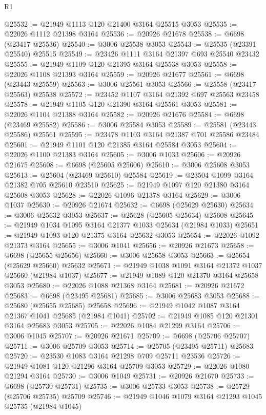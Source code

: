 \begin{lexlean}{R1}
\begin{coremodule}
@25532 := @21949 @1113 @120 @21400 @3164 @25515 @3053
@25535 := @22026 @1112 @21398 @3164
@25536 := @20926 @21678
@25538 := @6698 (@23417 @25536)
@25540 := @3006 @25538 @3053
@25543 := @25535 (@23391 @25540) @25515
@25549 := @23426 @1111 @3164 @21397 @693 @25540 @23432
@25555 := @21949 @1109 @120 @21395 @3164 @25538 @3053
@25558 := @22026 @1108 @21393 @3164
@25559 := @20926 @21677
@25561 := @6698 (@23443 @25559)
@25563 := @3006 @25561 @3053
@25566 := @25558 (@23417 @25563) @25538
@25572 := @23452 @1107 @3164 @21392 @697 @25563 @23458
@25578 := @21949 @1105 @120 @21390 @3164 @25561 @3053
@25581 := @22026 @1104 @21388 @3164
@25582 := @20926 @21676
@25584 := @6698 (@23469 @25582)
@25586 := @3006 @25584 @3053
@25589 := @25581 (@23443 @25586) @25561
@25595 := @23478 @1103 @3164 @21387 @701 @25586 @23484
@25601 := @21949 @1101 @120 @21385 @3164 @25584 @3053
@25604 := @22026 @1100 @21383 @3164
@25605 := @3006 @1033
@25606 := @20926 @21675
@25608 := @6698 (@25605 @25606)
@25610 := @3006 @25608 @3053
@25613 := @25604 (@23469 @25610) @25584
@25619 := @23504 @1099 @3164 @21382 @705 @25610 @23510
@25625 := @21949 @1097 @120 @21380 @3164 @25608 @3053
@25628 := @22026 @1096 @21378 @3164
@25629 := @3006 @1037
@25630 := @20926 @21674
@25632 := @6698 (@25629 @25630)
@25634 := @3006 @25632 @3053
@25637 := @25628 (@25605 @25634) @25608
@25645 := @21949 @1034 @1095 @3164 @21377 @1033 @25634 (@21984 @1033)
@25651 := @21949 @1093 @120 @21375 @3164 @25632 @3053
@25654 := @22026 @1092 @21373 @3164
@25655 := @3006 @1041
@25656 := @20926 @21673
@25658 := @6698 (@25655 @25656)
@25660 := @3006 @25658 @3053
@25663 := @25654 (@25629 @25660) @25632
@25671 := @21949 @1038 @1091 @3164 @21372 @1037 @25660 (@21984 @1037)
@25677 := @21949 @1089 @120 @21370 @3164 @25658 @3053
@25680 := @22026 @1088 @21368 @3164
@25681 := @20926 @21672
@25683 := @6698 (@23495 @25681)
@25685 := @3006 @25683 @3053
@25688 := @25680 (@25655 @25685) @25658
@25696 := @21949 @1042 @1087 @3164 @21367 @1041 @25685 (@21984 @1041)
@25702 := @21949 @1085 @120 @21301 @3164 @25683 @3053
@25705 := @22026 @1084 @21299 @3164
@25706 := @3006 @1045
@25707 := @20926 @21671
@25709 := @6698 (@25706 @25707)
@25711 := @3006 @25709 @3053
@25714 := @25705 (@23495 @25711) @25683
@25720 := @23530 @1083 @3164 @21298 @709 @25711 @23536
@25726 := @21949 @1081 @120 @21296 @3164 @25709 @3053
@25729 := @22026 @1080 @21294 @3164
@25730 := @3006 @1049
@25731 := @20926 @21670
@25733 := @6698 (@25730 @25731)
@25735 := @3006 @25733 @3053
@25738 := @25729 (@25706 @25735) @25709
@25746 := @21949 @1046 @1079 @3164 @21293 @1045 @25735 (@21984 @1045)

\end{coremodule}
\end{lexlean}
